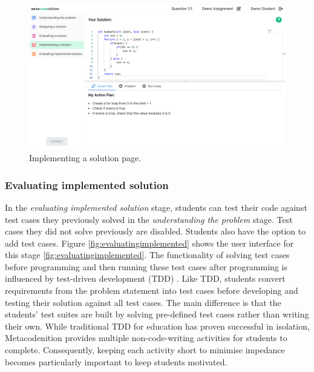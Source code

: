 \documentclass[sigconf,authorversion,nonacm]{acmart}
\begin{document}
\begin{figure}[h!]
  \centering
  \includegraphics[width=\linewidth]{implementing-a-solution}
  \caption{Implementing a solution page.}
  \label{fig:implementing}
\end{figure}

\subsubsection{Evaluating implemented solution}
In the \emph{evaluating implemented solution} stage, students can test their code against test cases they previously solved in the \emph{understanding the problem} stage. Test cases they did not solve previously are disabled. Students also have the option to add test cases. Figure \ref{fig:evaluatingimplemented} shows the user interface for this stage \ref{fig:evaluatingimplemented}. The functionality of solving test cases before programming and then running these test cases after programming is influenced by test-driven development (TDD) \cite{janzen2008}. Like TDD, students convert requirements from the problem statement into test cases before developing and testing their solution against all test cases. The main difference is that the students' test suites are built by solving pre-defined test cases rather than writing their own. While traditional TDD for education has proven successful in isolation, Metacodenition provides multiple non-code-writing activities for students to complete. Consequently, keeping each activity short to minimise impedance becomes particularly important to keep students motivated. 
\end{document}
